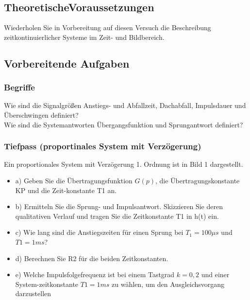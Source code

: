 \subsection{TheoretischeVoraussetzungen}

Wiederholen Sie in Vorbereitung auf diesen Versuch die Beschreibung 
zeitkontinuierlicher Systeme im Zeit- und Bildbereich.
\newline


\subsection{Vorbereitende Aufgaben}

\subsubsection{Begriffe}

Wie sind die Signalgrößen Anstiegs- und Abfallzeit, Dachabfall, Impulsdauer und Überschwingen definiert?\\
\newline%
Wie sind die Systemantworten Übergangsfunktion und Sprungantwort definiert?\\
\newline%

\subsubsection{Tiefpass (proportinales System mit Verzögerung)}

Ein proportionales System mit Verzögerung 1. Ordnung ist in Bild 1 dargestellt.\\
\begin{itemize}
\item a)    Geben  Sie  die  Übertragungsfunktion  $G(p)$,  die  Übertragungskonstante  KP und die Zeit-konstante T1 an.\\ 
\newline%
\item b)    Ermitteln  Sie  die  Sprung-  und  Impulsantwort. Skizzieren  Sie  deren  qualitativen  Verlauf und tragen Sie die Zeitkonstante T1 in h(t) ein.\\ 
\newline%
\item c)    Wie lang sind die Anstiegszeiten für einen Sprung bei $T_{ 1 }=100\mu s$ und $T1 = 1 ms$?\\ 
\newline%
\item d)    Berechnen Sie R2 für die beiden Zeitkonstanten.\\ 
\newline%
\item e)    Welche Impulsfolgefrequenz ist bei einem Tastgrad $k = 0,2$ und einer System-zeitkonstante $T1 = 1 ms$ zu wählen, um den Ausgleichsvorgang darzustellen\\
\newline%
\end{itemize}

